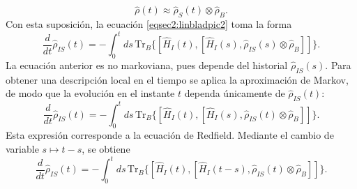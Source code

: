 \begin{equation*}
    \hat{\rho}(t) \approx \hat{\rho}_{S}(t)\otimes \hat{\rho}_{B}.
\end{equation*}
Con esta suposición, la ecuación \eqref{eqsec2:linbladpic2} toma la forma
\begin{equation}
    \frac{d}{dt}\hat{\rho}_{IS}(t) = - \int_{0}^{t} ds \,\text{Tr}_{B}\{[\hat{H}_{I}(t), [\hat{H}_{I}(s), \hat{\rho}_{IS}(s) \otimes \hat{\rho}_{B}]]\}.
\end{equation}
La ecuación anterior es no markoviana, pues depende del historial $\hat{\rho}_{IS}(s)$. Para obtener una descripción local en el tiempo se aplica la aproximación de Markov, de modo que la evolución en el instante $t$ dependa únicamente de $\hat{\rho}_{IS}(t)$:
\begin{equation*}
    \frac{d}{dt}\hat{\rho}_{IS}(t) = - \int_{0}^{t} ds \,\text{Tr}_{B}\{[\hat{H}_{I}(t), [\hat{H}_{I}(s), \hat{\rho}_{IS}(t) \otimes \hat{\rho}_{B}]]\}.
\end{equation*}
Esta expresión corresponde a la ecuación de Redfield. Mediante el cambio de variable $s \mapsto t-s$, se obtiene
\begin{equation}
    \frac{d}{dt}\hat{\rho}_{IS}(t) = - \int_{0}^{t} ds \,\text{Tr}_{B}\{[\hat{H}_{I}(t), [\hat{H}_{I}(t-s), \hat{\rho}_{IS}(t) \otimes \hat{\rho}_{B}]]\}.
    \label{eq3sec2:markov}
\end{equation}

